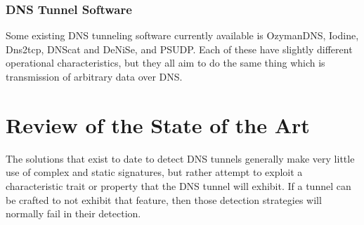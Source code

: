 \documentclass{llncs}
\begin{document}
\subsubsection{DNS Tunnel Software}
\label{tunnels-existing}
Some existing DNS tunneling software currently available is OzymanDNS\cite{ozymandnssrc},
Iodine\cite{iodinesrc}, Dns2tcp\cite{dns2tcpsrc}, DNScat\cite{dnscatsrc} and
DeNiSe\cite{denisesrc}, and PSUDP\cite{psudpsrc}. Each of these have slightly
different operational characteristics, but they all aim to do the same thing
which is transmission of arbitrary data over DNS.

\section{Review of the State of the Art}
\label{litreview}
The solutions that exist to date to detect DNS tunnels generally make very
little use of complex and static signatures, but rather attempt to exploit a
characteristic trait or property that the DNS tunnel will exhibit. If a tunnel
can be crafted to not exhibit that feature, then those detection strategies will
normally fail in their detection.
\end{document}
